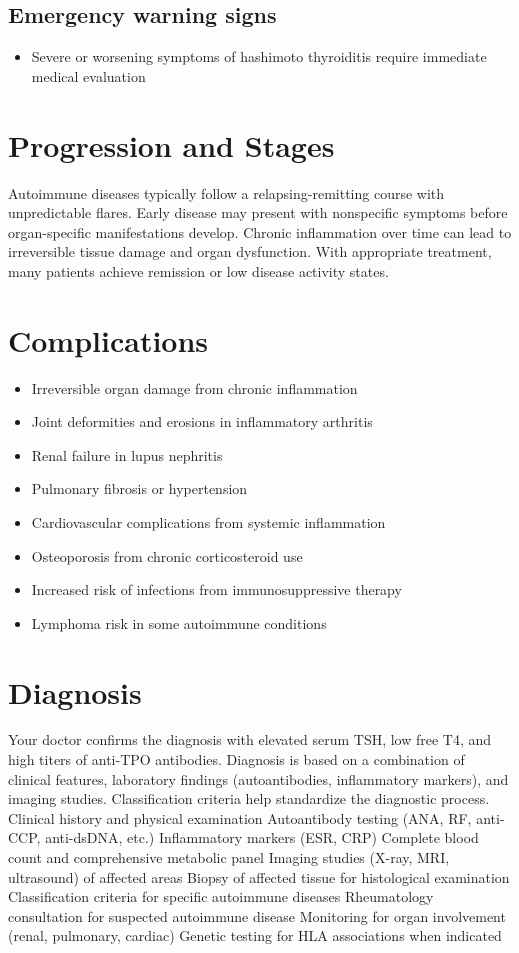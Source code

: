 \subsection{Emergency warning signs}
\begin{itemize}[noitemsep]
  \item Severe or worsening symptoms of hashimoto thyroiditis require immediate medical evaluation
\end{itemize}
\section{Progression and Stages}
Autoimmune diseases typically follow a relapsing-remitting course with unpredictable flares. Early disease may present with nonspecific symptoms before organ-specific manifestations develop. Chronic inflammation over time can lead to irreversible tissue damage and organ dysfunction. With appropriate treatment, many patients achieve remission or low disease activity states.
\section{Complications}
\begin{itemize}[noitemsep]
  \item Irreversible organ damage from chronic inflammation
  \item Joint deformities and erosions in inflammatory arthritis
  \item Renal failure in lupus nephritis
  \item Pulmonary fibrosis or hypertension
  \item Cardiovascular complications from systemic inflammation
  \item Osteoporosis from chronic corticosteroid use
  \item Increased risk of infections from immunosuppressive therapy
  \item Lymphoma risk in some autoimmune conditions
\end{itemize}
\section{Diagnosis}
Your doctor confirms the diagnosis with elevated serum TSH, low free T4, and high titers of anti-TPO antibodies. Diagnosis is based on a combination of clinical features, laboratory findings (autoantibodies, inflammatory markers), and imaging studies. Classification criteria help standardize the diagnostic process. Clinical history and physical examination Autoantibody testing (ANA, RF, anti-CCP, anti-dsDNA, etc.) Inflammatory markers (ESR, CRP) Complete blood count and comprehensive metabolic panel Imaging studies (X-ray, MRI, ultrasound) of affected areas Biopsy of affected tissue for histological examination Classification criteria for specific autoimmune diseases Rheumatology consultation for suspected autoimmune disease Monitoring for organ involvement (renal, pulmonary, cardiac) Genetic testing for HLA associations when indicated

